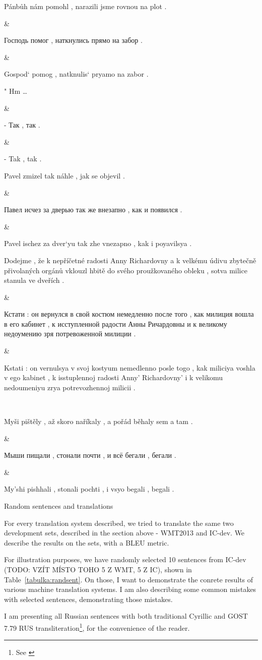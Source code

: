 {Pánbůh nám pomohl , narazili jsme rovnou na plot .

&

Господь помог , наткнулись прямо на забор .

&

Gospod` pomog , natknulis` pryamo na zabor .
\\ \hline

" Hm …

&

- Так , так .

&

- Tak , tak .
\\ \hline

Pavel zmizel tak náhle , jak se objevil .

&

Павел исчез за дверью так же внезапно , как и появился .

&

Pavel ischez za dver`yu tak zhe vnezapno , kak i poyavilsya .
\\ \hline

Dodejme , že k nepříčetné radosti Anny Richardovny a k velkému údivu zbytečně přivolaných orgánů vklouzl hbitě do svého proužkovaného obleku , sotva milice stanula ve dveřích .

&

Кстати : он вернулся в свой костюм немедленно после того , как милиция вошла в его кабинет , к исступленной радости Анны Ричардовны и к великому недоумению зря потревоженной милиции .

&

Kstati : on vernulsya v svoj kostyum nemedlenno posle togo , kak miliciya voshla v ego kabinet , k isstuplennoj radosti Anny' Richardovny' i k velikomu nedoumeniyu zrya potrevozhennoj milicii .

\\ \hline

Myši pištěly , až skoro naříkaly , a pořád běhaly sem a tam .

&

Мыши пищали , стонали почти , и всё бегали , бегали .

&

My'shi pishhali , stonali pochti , i vsyo begali , begali .
\\ \hline

}{Random sentences and translations}

For every translation system described, we tried to translate the same two development sets, described in the section above - WMT2013 and IC-dev. We describe the results on the sets, with a BLEU metric.

For illustration purposes, we have randomly selected 10 sentences from IC-dev (TODO: VZÍT MÍSTO TOHO 5 Z WMT, 5 Z IC), shown in Table~\ref{tabulka:randsent}. On those, I want to demonstrate the conrete results of various machine translation systems. I am also describing some common mistakes with selected sentences, demonstrating those mistakes.

I am presenting all Russian sentences with both traditional Cyrillic and GOST 7.79 RUS transliteration\footnote{See \cite{gost}}, for the convenience of the reader.

